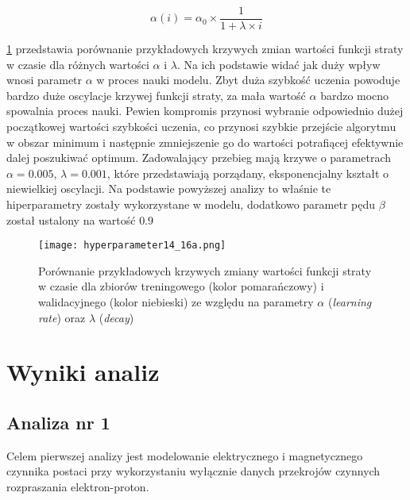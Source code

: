 \documentclass[11pt]{book}
\theoremstyle{definition}
\begin{document}
\begin{equation}
\alpha(i) = \alpha_0 \times \frac{1}{1 + \lambda \times i}
\end{equation}

\figurename{} \ref{fig:hyperparameters} przedstawia porównanie przykładowych krzywych zmian wartości funkcji straty w czasie dla różnych wartości $\alpha$ i $\lambda$. Na ich podstawie widać jak duży wpływ wnosi parametr $\alpha$ w proces nauki modelu. Zbyt duża szybkość uczenia powoduje bardzo duże oscylacje krzywej funkcji straty, za mała wartość $\alpha$ bardzo mocno spowalnia proces nauki. Pewien kompromis przynosi wybranie odpowiednio dużej początkowej wartości szybkości uczenia, co przynosi szybkie przejście algorytmu w obszar minimum i następnie zmniejszenie go do wartości potrafiącej efektywnie dalej poszukiwać optimum. Zadowalający przebieg mają krzywe o parametrach $\alpha = 0.005$, $\lambda = 0.001$, które przedstawiają porządany, eksponencjalny kształt o niewielkiej oscylacji. Na podstawie powyższej analizy to właśnie te hiperparametry zostały wykorzystane w modelu, dodatkowo parametr pędu $\beta$ został ustalony na wartość $0.9$


\begin{figure}[htp!]
	\centering
	\texttt{[image: hyperparameter14\_16a.png]}
	\caption{Porównanie przykładowych krzywych zmiany wartości funkcji straty w czasie dla zbiorów treningowego (kolor pomarańczowy) i walidacyjnego (kolor niebieski) ze względu na parametry $\alpha$ (\textit{learning rate}) oraz $\lambda$ (\textit{decay})}
	\label{fig:hyperparameters}
\end{figure}


\chapter{Wyniki analiz}

\section{Analiza nr 1}
%
Celem pierwszej analizy jest modelowanie elektrycznego i magnetycznego czynnika postaci przy wykorzystaniu wyłącznie danych przekrojów czynnych rozpraszania elektron-proton.
\end{document}
